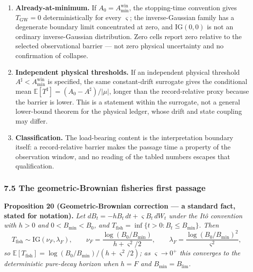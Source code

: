 \documentclass[11pt]{article}
\providecommand{\tightlist}{\setlength{\itemsep}{0pt}\setlength{\parskip}{0pt}}
\begin{document}
\begin{enumerate}
\def\labelenumi{\arabic{enumi}.}
\tightlist
\item
  \textbf{Already-at-minimum.} If \(A_0 = A_{\min}^{\mathrm{win}}\), the
  stopping-time convention gives \(T_{\mathrm{GW}} = 0\)
  deterministically for every \(\varsigma\); the inverse-Gaussian family
  has a degenerate boundary limit concentrated at zero, and
  \(\mathrm{IG}(0,0)\) is not an ordinary inverse-Gaussian distribution.
  Zero cells report zero relative to the selected observational barrier
  --- not zero physical uncertainty and no confirmation of collapse.
\item
  \textbf{Independent physical thresholds.} If an independent physical
  threshold \(A^\sharp < A_{\min}^{\mathrm{win}}\) is specified, the
  same constant-drift surrogate gives the conditional mean
  \(\mathbb{E}[T^\sharp] = (A_0 - A^\sharp)/|\mu|\), longer than the
  record-relative proxy because the barrier is lower. This is a
  statement within the surrogate, not a general lower-bound theorem for
  the physical ledger, whose drift and state coupling may differ.
\item
  \textbf{Classification.} The load-bearing content is the
  interpretation boundary itself: a record-relative barrier makes the
  passage time a property of the observation window, and no reading of
  the tabled numbers escapes that qualification.
\end{enumerate}

\subsubsection{7.5 The geometric-Brownian fisheries first
passage}\label{the-geometric-brownian-fisheries-first-passage}

\textbf{Proposition 20 (Geometric-Brownian correction --- a standard
fact, stated for notation).} \emph{Let
\(dB_t = -hB_t\, dt + \varsigma B_t\, dW_t\) under the It\^o convention
with \(h > 0\) and \(0 < B_{\min} < B_0\), and
\(T_{\mathrm{fish}} = \inf\{ t > 0 : B_t \le B_{\min} \}\). Then}
\[T_{\mathrm{fish}} \sim \mathrm{IG}(\nu_F, \lambda_F), \qquad \nu_F = \frac{\log(B_0/\allowbreak{}B_{\min})}{h + \varsigma^2/\allowbreak{}2}, \qquad \lambda_F = \frac{\log(B_0/\allowbreak{}B_{\min})^2}{\varsigma^2},\]
\emph{so
\(\mathbb{E}[T_{\mathrm{fish}}] = \log(B_0/\allowbreak{}B_{\min})/(h + \varsigma^2/\allowbreak{}2)\);
as \(\varsigma \to 0^+\) this converges to the deterministic pure-decay
horizon when \(h = F\) and \(B_{\min} = B_{\lim}\).}
\end{document}
